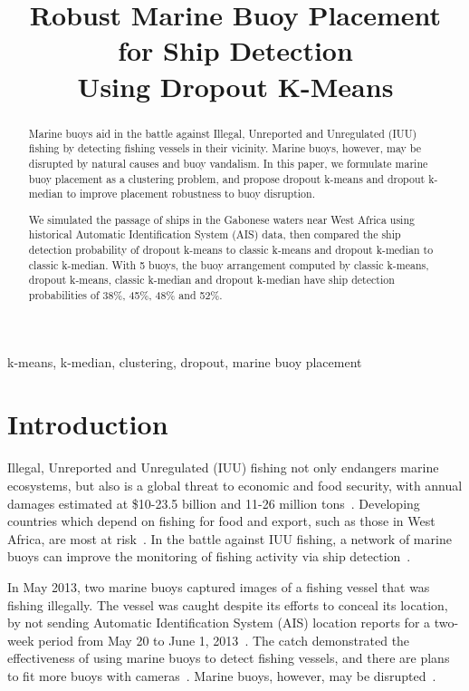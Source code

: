\documentclass{article}
\title{Robust Marine Buoy Placement for Ship Detection\\ Using Dropout K-Means}
\begin{document}
\graphicspath{{./Pictures/}}

%
\maketitle
%
\begin{abstract}
Marine buoys aid in the battle against Illegal, Unreported and Unregulated (IUU) fishing by detecting fishing vessels in their vicinity. Marine buoys, however, may be disrupted by natural causes and buoy vandalism. In this paper, we formulate marine buoy placement as a clustering problem, and propose dropout k-means and dropout k-median to improve placement robustness to buoy disruption.

We simulated the passage of ships in the Gabonese waters near West Africa using historical Automatic Identification System (AIS) data, then compared the ship detection probability of dropout k-means to classic k-means and dropout k-median to classic k-median. With 5 buoys, the buoy arrangement computed by classic k-means, dropout k-means, classic k-median and dropout k-median have ship detection probabilities of 38\%, 45\%, 48\% and 52\%. 

\end{abstract}
%
\begin{keywords}
k-means, k-median, clustering, dropout, marine buoy placement
\end{keywords}
%
\section{Introduction}

Illegal, Unreported  and Unregulated (IUU) fishing not only endangers marine ecosystems, but also is a global threat to economic and food security, with annual damages estimated at \$10-23.5 billion and 11-26 million tons~\cite{agnew2009iuu}.  Developing countries which depend on fishing for food and export, such as those in West Africa, are most at risk~\cite{noaa_iuu}. In the battle against IUU fishing, a network of marine buoys can improve the monitoring of fishing activity via ship detection~\cite{bruno2010_satelliteandacoustic, fefilatyev2012_buoycam, prasad2017_buoycam}. 

In May 2013, two marine buoys captured images of a fishing vessel that was fishing illegally. The vessel was caught despite its efforts to conceal its location, by not sending Automatic Identification System (AIS) location reports for a two-week period from May 20 to June 1, 2013~\cite{beets2014_buoyvandalism}. The catch demonstrated the effectiveness of using marine buoys to detect fishing vessels, and there are plans to fit more buoys with cameras~\cite{beets2014_buoyvandalism}. Marine buoys, however, may be disrupted~\cite{teng2009_buoyvandalism}. 
\end{document}
